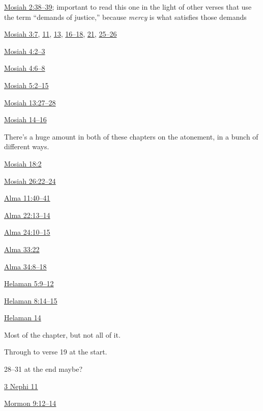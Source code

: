 \begin{compactitem}
\begin{compactitem}
					\item \hyperref[MOSIAH-2-38]{Mosiah 2:38--39}; important to read this one in the light of other verses that use the term ``demands of justice,'' because \textit{mercy} is what satisfies those demands
					\item \hyperref[MOSIAH-3-7]{Mosiah 3:7}, \hyperref[MOSIAH-3-11]{11}, \hyperref[MOSIAH-3-13]{13}, \hyperref[MOSIAH-3-16]{16--18}, \hyperref[MOSIAH-3-21]{21}, \hyperref[MOSIAH-3-25]{25--26}
					\item \hyperref[MOSIAH-4-2]{Mosiah 4:2--3}
					\item \hyperref[MOSIAH-4-6]{Mosiah 4:6--8}
					\item \hyperref[MOSIAH-5-2]{Mosiah 5:2--15}
					\item \hyperref[MOSIAH-13-27]{Mosiah 13:27--28}
					\item \hyperref[MOSIAH-14]{Mosiah 14--16}
						\begin{compactitem}
							\item There's a huge amount in both of these chapters on the atonement, in a bunch of different ways.
						\end{compactitem}
					\item \hyperref[MOSIAH-18-2]{Mosiah 18:2}
					\item \hyperref[MOSIAH-26-22]{Mosiah 26:22--24}
					\item \hyperref[ALMA-11-40]{Alma 11:40--41}
					\item \hyperref[ALMA-22-13]{Alma 22:13--14}
					\item \hyperref[ALMA-24-10]{Alma 24:10--15}
					\item \hyperref[ALMA-33-22]{Alma 33:22}
					\item \hyperref[ALMA-34-8]{Alma 34:8--18}
					\item \hyperref[HELAMAN-5-9]{Helaman 5:9--12}
					\item \hyperref[HELAMAN-8-14]{Helaman 8:14--15}
					\item \hyperref[HELAMAN-14]{Helaman 14}
						\begin{compactitem}
							\item Most of the chapter, but not all of it.
							\item Through to verse 19 at the start.
							\item 28--31 at the end maybe?
						\end{compactitem}
					\item \hyperref[3NEPHI-11]{3 Nephi 11}
					\item \hyperref[MORMON-9-12]{Mormon 9:12--14}

\end{compactitem}
\end{compactitem}
